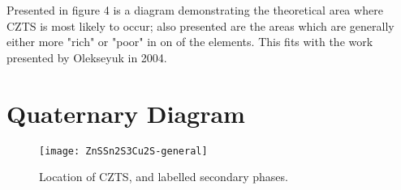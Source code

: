 Presented in figure 4 is a diagram demonstrating the theoretical area where CZTS is most likely to occur; also presented are the areas which are generally either more "rich" or "poor" in on of the elements. This fits with the work presented by Olekseyuk in 2004.\citep{Olekseyuk2004}


\section{Quaternary Diagram}

\begin{figure}
\centering
 \texttt{[image: ZnSSn2S3Cu2S-general]}
    \caption{Location of CZTS, and labelled secondary phases.}
    \label{fig:ZnSSn2S3Cu2S}
\end{figure}
